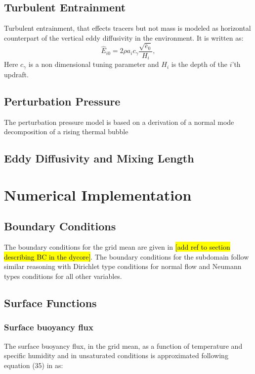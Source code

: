 \documentclass{report}
\begin{document}
\subsection{Turbulent Entrainment} \label{sec:Turbulent Entrainment}
Turbulent entrainment, that effects tracers but not mass is modeled as horizontal counterpart of the vertical eddy diffusivity in the environment. It is written as:
\begin{equation} \label{eq:turb_entr} 
\hat{E}_{i0} = 2 \rho a_i c_{\gamma} \frac{\sqrt{\bar{e}_0}}{H_i},
\end{equation}
Here $c_{\gamma}$ is a non dimensional tuning parameter and $H_i$ is the depth of the $i$'th updraft. 


\subsection{Perturbation Pressure} \label{sec:Perturbation Pressure}
The perturbation pressure model is based on a derivation of a normal mode decomposition of a rising thermal bubble \citep{}

\subsection{Eddy Diffusivity and Mixing Length} \label{sec:ED and ML}


\section{Numerical Implementation} \label{sec:Numerical Implementation}


\subsection{Boundary Conditions} \label{sec:Boundary Conditions}
The boundary conditions for the grid mean are given in \hl{[add ref to section describing BC in the dycore]}. The boundary conditions for the subdomain follow similar reasoning with Dirichlet type conditions for normal flow and Neumann types conditions for all other variables.  

\subsection{Surface Functions} \label{sec:Surface functions}
\subsubsection{Surface buoyancy flux}
The surface buoyancy flux, in the grid mean, as a function of temperature and specific humidity and in unsaturated conditions is approximated following equation (35) in \citep{Sommeria77a} as:
\end{document}
